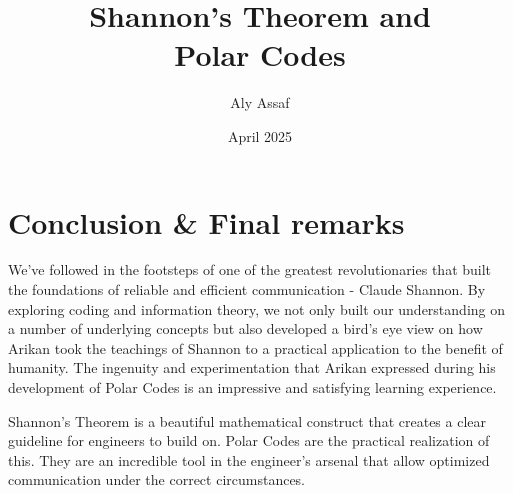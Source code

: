 \documentclass{article}
\title{\huge Shannon's Theorem and\\ Polar Codes}
\author{\Large Aly Assaf}
\date{\Large April 2025}
\begin{document}
\maketitle
{}

\begin{abstract}
    
\end{abstract}

\newpage

\renewcommand{\contentsname}{\LARGE Table of Contents}
\begingroup
\Large   %
\tableofcontents
\endgroup

\newpage













\section{Conclusion \& Final remarks}
We've followed in the footsteps of one of the greatest revolutionaries that built the foundations of reliable and efficient communication - Claude Shannon. By exploring coding and information theory, we not only built our understanding on a number of underlying concepts but also developed a bird's eye view on how Arikan took the teachings of Shannon to a practical application to the benefit of humanity. The ingenuity and experimentation that Arikan expressed during his development of Polar Codes is an impressive and satisfying learning experience. 

Shannon's Theorem is a beautiful mathematical construct that creates a clear guideline for engineers to build on. Polar Codes are the practical realization of this. They are an incredible tool in the engineer's arsenal that allow optimized communication under the correct circumstances.




\nocite{*}
\end{document}
